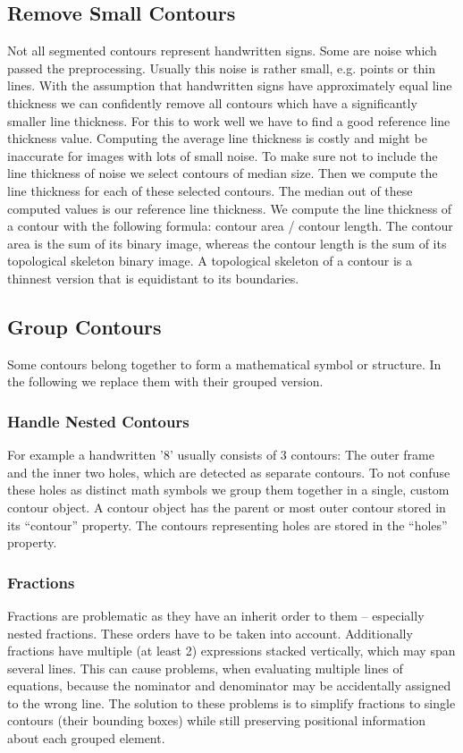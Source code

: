 \documentclass[12pt]{article}
\begin{document}
	\subsection{Remove Small Contours}
	Not all segmented contours represent handwritten signs.
	Some are noise which passed the preprocessing. Usually this noise is rather small, e.g. points or thin lines.
	With the assumption that handwritten signs have approximately equal line thickness we can confidently remove all contours which have a significantly smaller line thickness.
	For this to work well we have to find a good reference line thickness value.
	Computing the average line thickness is costly and might be inaccurate for images with lots of small noise.
	To make sure not to include the line thickness of noise we select contours of median size.
	Then we compute the line thickness for each of these selected contours.
	The median out of these computed values is our reference line thickness.
	We compute the line thickness of a contour with the following formula:
		contour area / contour length.
	The contour area is the sum of its binary image, whereas the contour length is the sum of its topological skeleton binary image.
	A topological skeleton of a contour is a thinnest version that is equidistant to its boundaries.
	
	\subsection{Group Contours}
	Some contours belong together to form a mathematical symbol or structure. In the following we replace them with their grouped version.

	\subsubsection{Handle Nested Contours}
	For example a handwritten '8' usually consists of 3 contours: The outer frame and the inner two holes, which are detected as separate contours.
	To not confuse these holes as distinct math symbols we group them together in a single, custom contour object.
	A contour object has the parent or most outer contour stored in its “contour” property.
	The contours representing holes are stored in the “holes” property.
	
	\subsubsection{Fractions}
	Fractions are problematic as they have an inherit order to them – especially nested fractions.
	These orders have to be taken into account. Additionally fractions have multiple (at least 2) expressions stacked vertically, which may span several lines.
	This can cause problems, when evaluating multiple lines of equations, because the nominator and denominator may be accidentally assigned to the wrong line.
	The solution to these problems is to simplify fractions to single contours (their bounding boxes) while still preserving positional information about each grouped element.
\end{document}
